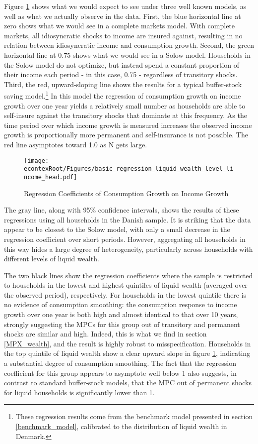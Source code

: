 \documentclass[titlepage]{\econtex}\newcommand{\texname}{ConsumptionHeterogeneity}
\begin{document}
Figure \ref{fig:GrowthReg} shows what we would expect to see under three well known models, as well as what we actually observe in the data. First, the blue horizontal line at zero shows what we would see in a complete markets model. With complete markets, all idiosyncratic shocks to income are insured against, resulting in no relation between idiosyncratic income and consumption growth. Second, the green horizontal line at 0.75 shows what we would see in a Solow model. Households in the Solow model do not optimize, but instead spend a constant proportion of their income each period - in this case, 0.75 - regardless of transitory shocks. Third, the red, upward-sloping line shows the results for a typical buffer-stock saving model.\footnote{These regression results come from the benchmark model presented in section \ref{benchmark_model}, calibrated to the distribution of liquid wealth in Denmark.} In this model the regression of consumption growth on income growth over one year yields a relatively small number as households are able to self-insure against the transitory shocks that dominate at this frequency. As the time period over which income growth is measured increases the observed income growth is proportionally more permanent and self-insurance is not possible. The red line asymptotes toward 1.0 as N gets large.
	\begin{figure} 
	\begin{centering}
		\texttt{[image: \\econtexRoot/Figures/basic\_regression\_liquid\_wealth\_level\_lincome\_head.pdf]}
		\caption{Regression Coefficients of Consumption Growth on Income Growth}
		\label{fig:GrowthReg}
	\end{centering}
\end{figure}

The gray line, along with 95\% confidence intervals, shows the results of these regressions using all households in the Danish sample. It is striking that the data appear to be closest to the Solow model, with only a small decrease in the regression coefficient over short periods. However, aggregating all households in this way hides a large degree of heterogeneity, particularly across households with different levels of liquid wealth.

The two black lines show the regression coefficients where the sample is restricted to households in the lowest and highest quintiles of liquid wealth (averaged over the observed period), respectively. For households in the lowest quintile there is no evidence of consumption smoothing: the consumption response to income growth over one year is both high and almost identical to that over 10 years, strongly suggesting the MPCs for this group out of transitory and permanent shocks are similar and high. Indeed, this is what we find in section \ref{MPX_wealth}, and the result is highly robust to misspecification. Households in the top quintile of liquid wealth show a clear upward slope in figure \ref{fig:GrowthReg}, indicating a substantial degree of consumption smoothing. The fact that the regression coefficient for this group appears to asymptote well below 1 also suggests, in contrast to standard buffer-stock models, that the MPC out of permanent shocks for liquid households is significantly lower than 1.
\end{document}
